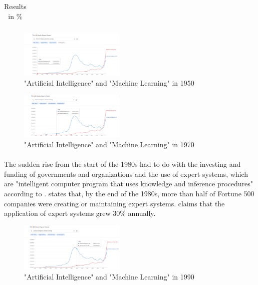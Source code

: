 \documentclass[11pt]{article}
\begin{document}
{\begin{table}[hbtp]
\begin{tabular}{|ccc|}
\hline
\end{tabular}
\caption{Results in \%}
\label{tbl:results}
\end{table}

\begin{figure}
  \centering
  \includegraphics[width=0.45\textwidth]{Screenshot 2024-01-13 210601.png}
  \caption{"Artificial Intelligence" and "Machine Learning" in 1950}
  \label{fig:ngram1}
\end{figure}

\begin{figure}
  \centering
  \includegraphics[width=0.45\textwidth]{Screenshot 2024-01-16 214359.png}
  \caption{"Artificial Intelligence" and "Machine Learning" in 1970}
  \label{fig:ngram1}
\end{figure}

\paragraph{}The sudden rise from the start of the 1980s had to do with the investing and funding of governments and organizations and the use of expert systems, which are "intelligent computer program that uses knowledge and inference
procedures" according to \cite{Feigenbaum:ea:1980}. \citep{Washington:2006} states that, by the end of the 1980s, more than half of Fortune 500 companies were creating or maintaining expert systems. \cite{Washington:2006} claims that the application of expert systems grew 30\% annually.

\begin{figure}
  \centering
  \includegraphics[width=0.45\textwidth]{Screenshot 2024-01-16 214434.png}
  \caption{"Artificial Intelligence" and "Machine Learning" in 1990}
  \label{fig:ngram1}
\end{figure}

}
\end{document}
